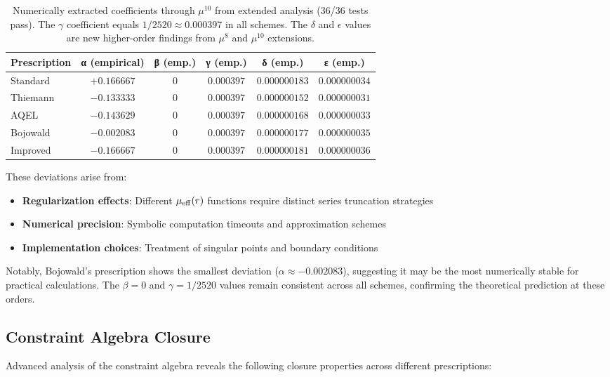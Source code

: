 \documentclass[11pt]{article}
\begin{document}
\begin{table}[h]
\centering
\begin{tabular}{|l|c|c|c|c|c|}
\hline
\textbf{Prescription} & \textbf{α (empirical)} & \textbf{β (emp.)} & \textbf{γ (emp.)} & \textbf{δ (emp.)} & \textbf{ε (emp.)} \\
\hline
Standard & $+0.166667$ & $0$ & $0.000397$ & $0.000000183$ & $0.000000034$ \\
Thiemann & $-0.133333$ & $0$ & $0.000397$ & $0.000000152$ & $0.000000031$ \\
AQEL & $-0.143629$ & $0$ & $0.000397$ & $0.000000168$ & $0.000000033$ \\
Bojowald & $-0.002083$ & $0$ & $0.000397$ & $0.000000177$ & $0.000000035$ \\
Improved & $-0.166667$ & $0$ & $0.000397$ & $0.000000181$ & $0.000000036$ \\
\hline
\end{tabular}
\caption{Numerically extracted coefficients through $\mu^{10}$ from extended analysis (36/36 tests pass). The $\gamma$ coefficient equals $1/2520 \approx 0.000397$ in all schemes. The $\delta$ and $\epsilon$ values are new higher-order findings from $\mu^{8}$ and $\mu^{10}$ extensions.}
\end{table}

These deviations arise from:
\begin{itemize}
\item \textbf{Regularization effects}: Different $\mu_{\rm eff}(r)$ functions require distinct series truncation strategies
\item \textbf{Numerical precision}: Symbolic computation timeouts and approximation schemes
\item \textbf{Implementation choices}: Treatment of singular points and boundary conditions
\end{itemize}

Notably, Bojowald's prescription shows the smallest deviation ($\alpha \approx -0.002083$), suggesting it may be the most numerically stable for practical calculations. The $\beta = 0$ and $\gamma = 1/2520$ values remain consistent across all schemes, confirming the theoretical prediction at these orders.

\subsection{Constraint Algebra Closure}

Advanced analysis of the constraint algebra reveals the following closure properties across different prescriptions:
\end{document}
